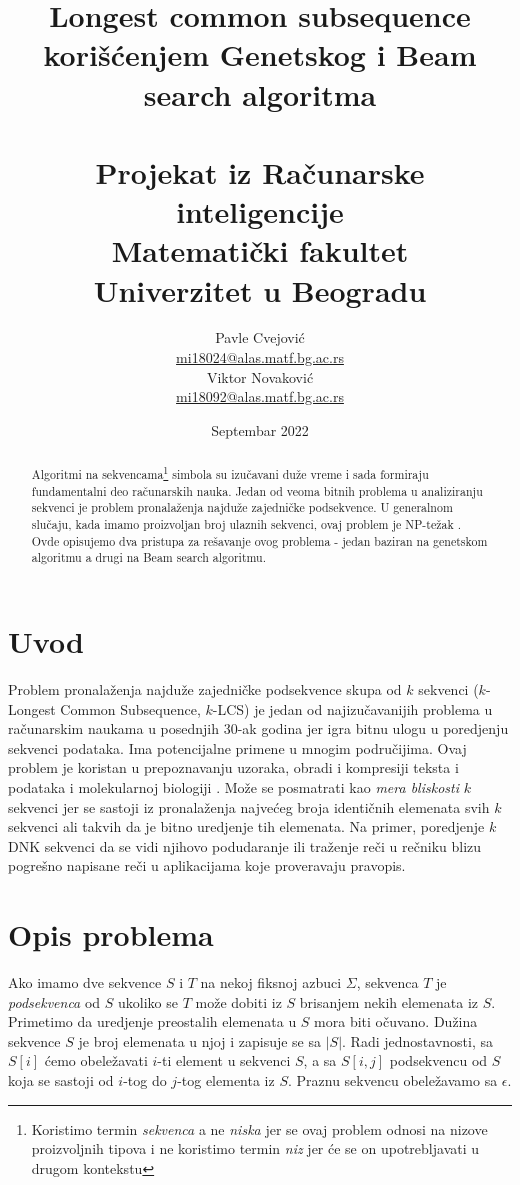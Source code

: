 \documentclass{article}
\title{%
    Longest common subsequence korišćenjem Genetskog i Beam search algoritma \\~\\
    \large Projekat iz Računarske inteligencije \\
    Matematički fakultet \\
    Univerzitet u Beogradu
}
\author{
    Pavle Cvejović\\
    \href{mailto:mi18024@alas.matf.bg.ac.rs}{mi18024@alas.matf.bg.ac.rs} \\
    Viktor Novaković\\
    \href{mailto:mi18092@alas.matf.bg.ac.rs}{mi18092@alas.matf.bg.ac.rs} \\
}
\date{Septembar 2022}
\begin{document}
    \renewcommand{\abstractname}{Apstrakt}

    \maketitle

    \begin{abstract}
        Algoritmi na sekvencama\footnote{Koristimo termin \emph{sekvenca} a ne \emph{niska} jer se ovaj problem odnosi na nizove proizvoljnih tipova i ne koristimo termin \emph{niz} jer će se on upotrebljavati u drugom kontekstu}  simbola su izučavani duže vreme i sada formiraju fundamentalni deo računarskih nauka. Jedan od veoma bitnih problema u analiziranju sekvenci je problem pronalaženja najduže zajedničke podsekvence. U generalnom slučaju, kada imamo proizvoljan broj ulaznih sekvenci, ovaj problem je NP-težak \cite{np}. Ovde opisujemo dva pristupa za rešavanje ovog problema - jedan baziran na genetskom algoritmu a drugi na Beam search algoritmu.
    \end{abstract}

    \pagebreak

    \tableofcontents

    \pagebreak


    \section{Uvod}
    Problem pronalaženja najduže zajedničke podsekvence skupa od $k$ sekvenci ($k$-Longest Common Subsequence, $k$-LCS) je jedan od najizučavanijih problema u računarskim naukama u posednjih 30-ak godina jer igra bitnu ulogu u poredjenju sekvenci podataka. Ima potencijalne primene u mnogim područijima. Ovaj problem je koristan u prepoznavanju uzoraka, obradi i kompresiji teksta i podataka \cite{dc} i molekularnoj biologiji \cite{cg}. Može se posmatrati kao \emph{mera bliskosti} $k$ sekvenci jer se sastoji iz pronalaženja najvećeg broja identičnih elemenata svih $k$ sekvenci ali takvih da je bitno uredjenje tih elemenata. Na primer, poredjenje $k$ DNK sekvenci da se vidi njihovo podudaranje ili traženje reči u rečniku blizu pogrešno napisane reči u aplikacijama koje proveravaju pravopis.


    \section{Opis problema}

    Ako imamo dve sekvence $S$ i $T$ na nekoj fiksnoj azbuci $\Sigma$, sekvenca $T$ je \emph{podsekvenca} od $S$ ukoliko se $T$ može dobiti iz $S$ brisanjem nekih elemenata iz $S$. Primetimo da uredjenje preostalih elemenata u $S$ mora biti očuvano. Dužina sekvence $S$ je broj elemenata u njoj i zapisuje se sa $|S|$. Radi jednostavnosti, sa $S[i]$ ćemo obeležavati $i$-ti element u sekvenci $S$, a sa $S[i,j]$ podsekvencu od $S$ koja se sastoji od $i$-tog do $j$-tog elementa iz $S$. Praznu sekvencu obeležavamo sa $\epsilon$.\\
\end{document}
